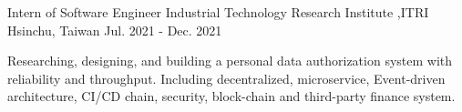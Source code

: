 

\begin{cventries}


  \cventry
    {Intern of Software Engineer} %
    {Industrial Technology Research Institute ,ITRI} %
    {Hsinchu, Taiwan} %
    {Jul. 2021 - Dec. 2021} %
    {
      \begin{cvitems} %
        \item {Researching, designing, and building a personal data authorization system with reliability and throughput. Including decentralized, microservice, Event-driven architecture, CI/CD chain, security, block-chain and third-party finance system. }
      \end{cvitems}
    }



\end{cventries}
